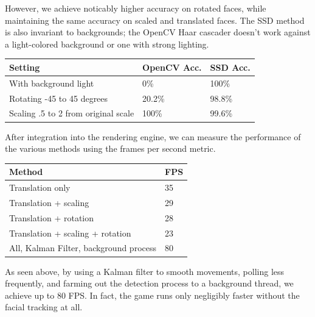 \documentclass[10pt,twocolumn,letterpaper]{article}
\begin{document}
However, we achieve noticably higher accuracy on rotated faces, while maintaining the same accuracy on scaled and translated faces. The SSD method is also invariant to backgrounds; the OpenCV Haar cascader doesn't work against a light-colored background or one with strong lighting.

\begin{center}
    \begin{tabular}{| l | l | l |}
    \hline
    \textbf{Setting}                     & \textbf{OpenCV Acc.} & \textbf{SSD Acc.}          \\ \hline
     With background light                  & 0\%       & 100\%       \\ \hline 
     Rotating -45 to 45 degrees           &  20.2\%  & 98.8\%      \\ \hline                 
     Scaling .5 to 2 from original scale & 100\%    & 99.6\%                 \\  \hline
\end{tabular}
\end{center}

After integration into the rendering engine, we can measure the performance of the various methods using the frames per second metric.

\begin{center}
    \begin{tabular}{| l | l |}
    \hline
     \textbf{Method}                                                 & \textbf{FPS}       \\ \hline
     Translation only                                    & 35           \\ \hline 
     Translation + scaling                             &  29           \\ \hline      
    Translation + rotation                            & 28             \\ \hline           
    Translation + scaling + rotation              & 23             \\  \hline
    All, Kalman Filter, background process    & 80             \\   \hline
\end{tabular}
\end{center}

As seen above, by using a Kalman filter to smooth movements, polling less frequently, and farming out the detection process to a background thread, we achieve up to 80 FPS. In fact, the game runs only negligibly faster without the facial tracking at all.
\end{document}
